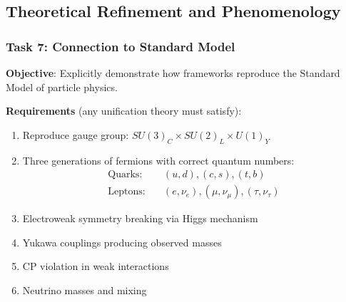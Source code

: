 \subsection{Theoretical Refinement and Phenomenology}

\subsubsection{Task 7: Connection to Standard Model}

\textbf{Objective}: Explicitly demonstrate how frameworks reproduce the Standard Model of particle physics.

\textbf{Requirements} (any unification theory must satisfy):
\begin{enumerate}
    \item Reproduce gauge group: $SU(3)_C \times SU(2)_L \times U(1)_Y$
    \item Three generations of fermions with correct quantum numbers:
    \begin{align}
    \text{Quarks:} \quad &(u,d), (c,s), (t,b) \\
    \text{Leptons:} \quad &(e,\nu_e), (\mu,\nu_\mu), (\tau,\nu_\tau)
    \end{align}
    \item Electroweak symmetry breaking via Higgs mechanism
    \item Yukawa couplings producing observed masses
    \item CP violation in weak interactions
    \item Neutrino masses and mixing
\end{enumerate}

